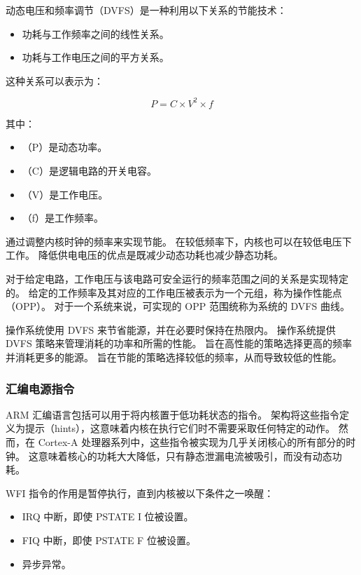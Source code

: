 动态电压和频率调节（DVFS）是一种利用以下关系的节能技术：

\begin{itemize}
\item
  功耗与工作频率之间的线性关系。
\item
  功耗与工作电压之间的平方关系。
\end{itemize}

这种关系可以表示为：

$$ P = C \times V^2 \times f $$

其中：
\begin{itemize}
\item
（P）是动态功率。
\item
（C）是逻辑电路的开关电容。
\item
（V）是工作电压。
\item
（f）是工作频率。
\end{itemize}

通过调整内核时钟的频率来实现节能。
在较低频率下，内核也可以在较低电压下工作。
降低供电电压的优点是既减少动态功耗也减少静态功耗。

对于给定电路，工作电压与该电路可安全运行的频率范围之间的关系是实现特定的。
给定的工作频率及其对应的工作电压被表示为一个元组，称为操作性能点（OPP）。
对于一个系统来说，可实现的 OPP 范围统称为系统的 DVFS 曲线。

操作系统使用 DVFS 来节省能源，并在必要时保持在热限内。
操作系统提供 DVFS 策略来管理消耗的功率和所需的性能。
旨在高性能的策略选择更高的频率并消耗更多的能源。
旨在节能的策略选择较低的频率，从而导致较低的性能。

\subsubsection{汇编电源指令}

ARM 汇编语言包括可以用于将内核置于低功耗状态的指令。
架构将这些指令定义为提示（hints），这意味着内核在执行它们时不需要采取任何特定的动作。
然而，在 Cortex-A 处理器系列中，这些指令被实现为几乎关闭核心的所有部分的时钟。
这意味着核心的功耗大大降低，只有静态泄漏电流被吸引，而没有动态功耗。

WFI 指令的作用是暂停执行，直到内核被以下条件之一唤醒：

\begin{itemize}
\item
  IRQ 中断，即使 PSTATE I 位被设置。
\item
  FIQ 中断，即使 PSTATE F 位被设置。
\item
  异步异常。
\end{itemize}

